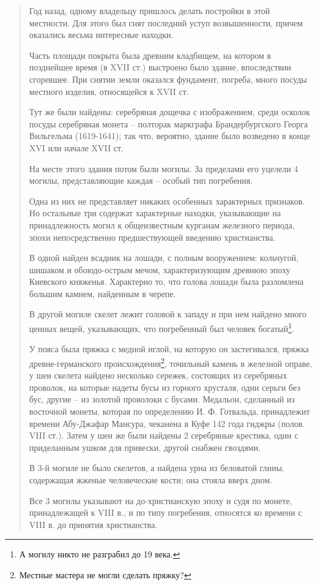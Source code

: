 \begin{quotation}
Год назад, одному владельцу пришлось делать постройки в этой местности. Для этого был снят последний уступ возвышенности, причем оказались весьма интересные находки.

Часть площади покрыта была древним кладбищем, на котором в позднейшее время (в XVII ст.) выстроено было здание, впоследствии сгоревшее. При снятии земли оказался фундамент, погреба, много посуды местного изделия, относящейся к XVII ст. 

Тут же были найдены: серебряная дощечка с изображением, среди осколок посуды серебряная монета – полторак маркграфа Брандербургского Георга Вильгельма (1619-1641); так что, вероятно, здание было возведено в конце XVI или начале XVII ст.

На месте этого здания потом были могилы. За пределами его уцелели 4 могилы, представляющие каждая – особый тип погребения.

Одна из них не представляет никаких особенных характерных признаков. Но остальные три содержат характерные находки, указывающие на принадлежность могил к общеизвестным курганам железного периода, эпохи непосредственно предшествующей введению христианства.

В одной найден всадник на лошади, с полным вооружением: кольчугой, шишаком и обо\-юдо-острым мечом, характеризующим древнюю эпоху Киевского княженья. Характерно то, что голова лошади была разломлена большим камнем, найденным в черепе.

В другой могиле скелет лежит головой к западу и при нем найдено много ценных вещей, указывающих, что погребенный был человек богатый\footnote{А могилу никто не разграбил до 19 века.}.

У пояса была пряжка с медной иглой, на которую он застегивался, пряжка древне-герман\-ского происхождения\footnote{Местные мастера не могли сделать пряжку?}, точильный камень в железной оправе, у шеи скелета найдено нес\-колько сережек, состоящих из серебряных проволок, на которые надеты бусы из горного хрусталя, одни серьги без бус, другие – из золотой проволоки с бусами. Медальон, сделанный из восточной монеты, которая по определению И. Ф. Готвальда, принадлежит времени Абу-Джафар Мансура, чеканена в Куфе 142 года гиджры (полов. VIII ст.). Затем у шеи же были найдены 2 серебряные крестика, один с приделанным ушком для привески, другой снабжен гвоздями.

В 3-й могиле не было скелетов, а найдена урна из беловатой глины, содержащая жженые человеческие кости; она стояла вверх дном.

Все 3 могилы указывают на до-христианскую эпоху и судя по монете, принадлежащей к VIII в., и по типу погребения, относятся ко времени с VIII в. до принятия христианства.


\end{quotation}
